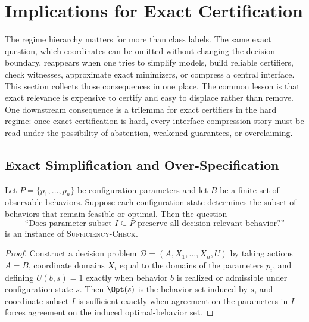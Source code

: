 \section{Implications for Exact Certification}\label{sec:engineering-corollaries}

The regime hierarchy matters for more than class labels. The same exact question, which coordinates can be omitted without changing the decision boundary, reappears when one tries to simplify models, build reliable certifiers, check witnesses, approximate exact minimizers, or compress a central interface. This section collects those consequences in one place. The common lesson is that exact relevance is expensive to certify and easy to displace rather than remove. One downstream consequence is a trilemma for exact certifiers in the hard regime: once exact certification is hard, every interface-compression story must be read under the possibility of abstention, weakened guarantees, or overclaiming.

\subsection{Exact Simplification and Over-Specification}

\begin{proposition}
\label{prop:config-sufficiency}
Let $P=\{p_1,\ldots,p_n\}$ be configuration parameters and let $B$ be a finite set of observable behaviors. Suppose each configuration state determines the subset of behaviors that remain feasible or optimal. Then the question
\[
\text{``Does parameter subset } I \subseteq P \text{ preserve all decision-relevant behavior?''}
\]
is an instance of \textnormal{\textsc{Sufficiency-Check}}.
\end{proposition}


\begin{proof}
Construct a decision problem $\mathcal{D}=(A,X_1,\ldots,X_n,U)$ by taking actions $A=B$, coordinate domains $X_i$ equal to the domains of the parameters $p_i$, and defining $U(b,s)=1$ exactly when behavior $b$ is realized or admissible under configuration state $s$. Then $\Opt(s)$ is the behavior set induced by $s$, and coordinate subset $I$ is sufficient exactly when agreement on the parameters in $I$ forces agreement on the induced optimal-behavior set.
\end{proof}

